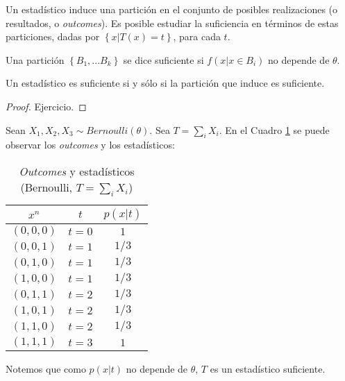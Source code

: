 Un estadístico induce una partición en el conjunto de posibles realizaciones (o resultados, o \emph{outcomes}). Es posible estudiar la suficiencia en términos de estas particiones, dadas por $\left \{ x | T(x) = t \right  \}$, para cada $ t $. 

\begin{definition}
    Una partición $ \left \{ B_1,...B_k \right \}$ se dice suficiente si $f(x | x \in B_i) $ no depende de $\theta$. 
\end{definition}
\begin{theorem}
    Un estadístico es suficiente si y sólo si la partición que induce es suficiente.
\end{theorem}
\begin{proof}
Ejercicio. 
\end{proof}

\begin{example}
Sean $X_1,X_2, X_3\sim Bernoulli(\theta)$. Sea $T= \sum_{i} X_i$. En el Cuadro \ref{tab: Part.Bernoulli suficiente} se puede observar los \emph{outcomes} y los estadísticos: 
\begin{table}[h]
    \centering
    \begin{tabular}{c  c  c}  
        $x^{n} $  & $t$  & $ p(x|t) $\\ \hline
        $ (0,0,0) $ & $t=0$ & $1$ \\  \hline
       $ (0,0,1) $ & $t=1$ & $1/3$   \\
        $ (0,1,0) $ & $t=1$ & $1/3$ \\
        $ (1,0,0) $  & $t=1$ & $1/3$ \\ \hline 
        $ (0,1,1) $ & $t=2$ & $1/3$   \\
        $ (1,0,1) $ & $t=2$ & $1/3$ \\
        $ (1,1,0) $  & $t=2$ & $1/3$ \\ \hline 
        $ (1,1,1) $ & $t=3$ & $1$ \\
        
        
    \end{tabular}
    \caption{\emph{Outcomes} y estadísticos (Bernoulli, $T= \sum_{i} X_i$)  }
    \label{tab: Part.Bernoulli suficiente}
\end{table}
Notemos que como $p(x | t )$ no depende de $\theta$, $T$ es un estadístico suficiente. 
\end{example}


